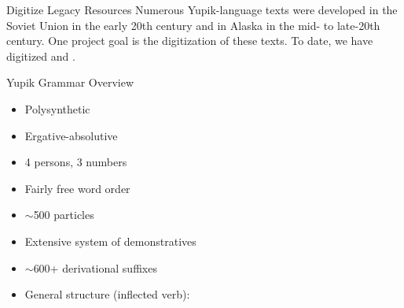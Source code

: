 \documentclass[usenames,dvipsnames]{beamer}
\begin{document}
\begin{frame}[fragile]
\begin{columns}[T]
\begin{column}{0.3\textwidth}
\begin{block}{Digitize Legacy Resources}
Numerous Yupik-language texts were developed in the Soviet Union in the early 20th century and in Alaska in the mid- to late-20th century.
%
One project goal is the digitization of these texts.
%
To date, we have digitized \citet{Apassingok:LoreSLI, Apassingok:Readers} and \citet{Koonooka:2003}.
%

\end{block}

\begin{block}{Yupik Grammar Overview}

 \begin{itemize}
 \setlength\itemsep{18pt}
    \item Polysynthetic
    \item Ergative-absolutive
    \item 4 persons, 3 numbers
    \item Fairly free word order
    \item $\sim$500 particles
    \item Extensive system of demonstratives
    \item $\sim$600+ derivational suffixes
     \item General structure (inflected verb):
    
    \vspace{24pt}
    
    \hspace*{-42pt}
    

\end{itemize}
\end{block}
\end{column}
\end{columns}
\end{frame}
\end{document}
